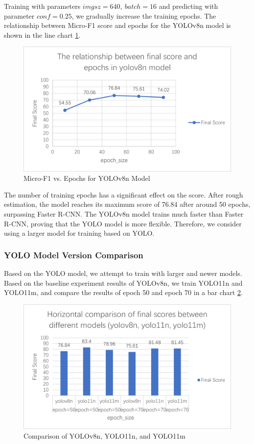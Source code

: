 Training with parameters $imgsz = 640,\ batch = 16$ and predicting with parameter $conf = 0.25$, we gradually increase the training epochs. The relationship between Micro-F1 score and epochs for the YOLOv8n model is shown in the line chart \cref{fig:yolov8n}.
\begin{figure}[t]
  \centering
  \includegraphics[width=0.8\linewidth]{./graphs/图片2.png}

  \caption{Micro-F1 vs. Epochs for YOLOv8n Model}
  \label{fig:yolov8n}
\end{figure}

The number of training epochs has a significant effect on the score. After rough estimation, the model reaches its maximum score of 76.84 after around 50 epochs, surpassing Faster R-CNN. The YOLOv8n model trains much faster than Faster R-CNN, proving that the YOLO model is more flexible. Therefore, we consider using a larger model for training based on YOLO.

\subsubsection{YOLO Model Version Comparison}

Based on the YOLO model, we attempt to train with larger and newer models. Based on the baseline experiment results of YOLOv8n, we train YOLO11n and YOLO11m, and compare the results of epoch 50 and epoch 70 in a bar chart \cref{fig:yolo-compare}.
\begin{figure}[t]
  \centering
  \includegraphics[width=0.8\linewidth]{./graphs/图片3.png}

  \caption{Comparison of YOLOv8n, YOLO11n, and YOLO11m}
  \label{fig:yolo-compare}
\end{figure}

